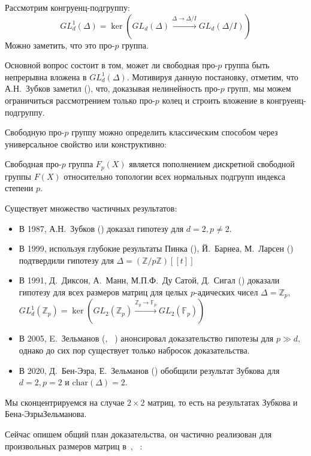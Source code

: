 Рассмотрим конгруенц-подгруппу:
\[
    GL_d^1(\Delta) = \ker\left( GL_d(\Delta) \xrightarrow{\Delta\to\Delta/I} GL_d(\Delta/I) \right)
\]
Можно заметить, что это про-$p$ группа.


Основной вопрос состоит в том, может ли свободная про-$p$ группа быть непрерывна вложена в $GL_d^1(\Delta)$.
Мотивируя данную постановку, отметим, что А.Н.\ Зубков заметил (\cite{Zubkov}), что, доказывая нелинейность про-$p$ групп, мы можем ограничиться рассмотрением только про-$p$ колец и строить вложение в конгруенц-подгруппу.

Свободную про-$p$ группу можно определить классическим способом через универсальное свойство или конструктивно:

\vskip 0.1in\noindent
\begin{definition}
    Свободная про-$p$ группа $F_p(X)$ является пополнением дискретной свободной группы $F(X)$ относительно топологии всех нормальных подгрупп индекса степени $p$.
\end{definition}
\vskip 0.1in\noindent

Существует множество частичных результатов:
\begin{itemize}
    \item В 1987, А.Н.\ Зубков (\cite{Zubkov}) доказал гипотезу для $d=2, p\neq2$.
    \item В 1999, используя глубокие результаты Пинка (\cite{Pink}), Й.\ Барнеа, М.\ Ларсен (\cite{Barnea-Larsen}) подтвердили гипотезу для $\Delta=\left( \mathbb{Z}/p\mathbb{Z} \right)[[t]]$
    \item В 1991, Д.\ Диксон, А.\ Манн, М.П.Ф.\ Ду Сатой, Д.\ Сигал (\cite{DMSD}) доказали гипотезу для всех размеров матриц для целых $p$-адических чисел $\Delta=\mathbb{Z}_p$, $GL_d^1(\mathbb{Z}_p)=\ker\left( GL_2(\mathbb{Z}_p) \xrightarrow{\mathbb{Z}_p\to\mathbb{F}_p} GL_2(\mathbb{F}_p) \right)$
    \item В 2005, E.\ Зельманов (\cite{Zelmanov1}, ~\cite{Zelmanov2}) анонсировал доказательство гипотезы для $p\gg d$, однако до сих пор существует только набросок доказательства.
    \item В 2020, Д.\ Бен-Эзра, Е.\ Зельманов (\cite{Ben-Ezra-Zelmanov}) обобщили результат Зубкова для $d=2, p=2$ и $\mathrm{char}(\Delta)=2$.
\end{itemize}

Мы сконцентрируемся на случае $2\times 2$ матриц, то есть на результатах Зубкова и Бена-Эзры\textemdash Зельманова.

Сейчас опишем общий план доказательства, он частично реализован для произвольных размеров матриц в\ \cite{Zelmanov1}, ~\cite{Zelmanov2}:

